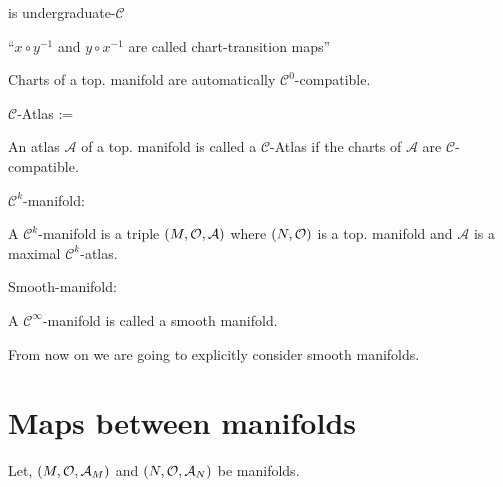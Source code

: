is undergraduate-$ \mathcal{C}$

\begin{figure}[H]
\centering
{}
\end{figure}

``$ x \circ y^{-1}$ and $ y \circ x^{-1}$ are called chart-transition maps''

Charts of a top. manifold are automatically $ \mathcal{C}^0$-compatible.

\begin{definition}
    $ \mathcal{C}$-Atlas :=

    An atlas $ \mathcal{A}$ of a top. manifold is called a $ \mathcal{C}$-Atlas if the charts of $ \mathcal{A}$ are $ \mathcal{C}$-compatible.
\end{definition}

\begin{definition}
    $ \mathcal{C}^k$-manifold:

    A $ \mathcal{C}^k$-manifold is a triple $ \left(  M, \mathcal{O}, \mathcal{A} \right)$ where $ \left(  N, \mathcal{O} \right)$ is a top. manifold and $ \mathcal{A}$ is a maximal $ \mathcal{C}^k$-atlas.
\end{definition}

\begin{definition}
    Smooth-manifold:

    A $ \mathcal{C}^\infty$-manifold is called a smooth manifold.
\end{definition}

From now on we are going to explicitly consider smooth manifolds.

\section{Maps between manifolds}

Let, $ \left(  M, \mathcal{O}, \mathcal{A}_M \right)$ and $ \left(  N, \mathcal{O}, \mathcal{A}_N \right)$ be manifolds.


